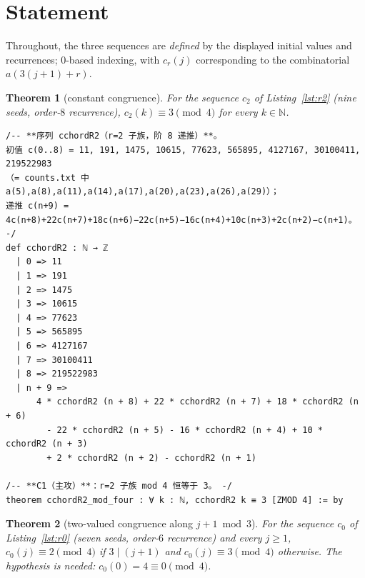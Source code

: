 \documentclass[11pt]{article}
\newtheorem{theorem}{Theorem}
\theoremstyle{definition}
\begin{document}
\section{Statement}\label{sec:statement}

Throughout, the three sequences are \emph{defined} by the displayed initial
values and recurrences; $0$-based indexing, with $c_r(j)$ corresponding to the
combinatorial $a(3(j+1)+r)$.

\begin{theorem}[constant congruence]\label{thm:r2}
For the sequence $c_2$ of Listing~\ref{lst:r2} (nine seeds, order-$8$
recurrence), $c_2(k)\equiv 3\pmod 4$ for every $k\in\mathbb{N}$.
\end{theorem}

\begin{lstlisting}[caption={Frozen formal statement, verbatim lines 22--42 of
\texttt{formalized/01-cchord-mods.lean} (sha256 \texttt{a69d00e5}).},
label={lst:r2}]
/-- **序列 cchordR2（r=2 子族，阶 8 递推）**。
初值 c(0..8) = 11, 191, 1475, 10615, 77623, 565895, 4127167, 30100411, 219522983
（= counts.txt 中 a(5),a(8),a(11),a(14),a(17),a(20),a(23),a(26),a(29)）；
递推 c(n+9) = 4c(n+8)+22c(n+7)+18c(n+6)−22c(n+5)−16c(n+4)+10c(n+3)+2c(n+2)−c(n+1)。 -/
def cchordR2 : ℕ → ℤ
  | 0 => 11
  | 1 => 191
  | 2 => 1475
  | 3 => 10615
  | 4 => 77623
  | 5 => 565895
  | 6 => 4127167
  | 7 => 30100411
  | 8 => 219522983
  | n + 9 =>
      4 * cchordR2 (n + 8) + 22 * cchordR2 (n + 7) + 18 * cchordR2 (n + 6)
        - 22 * cchordR2 (n + 5) - 16 * cchordR2 (n + 4) + 10 * cchordR2 (n + 3)
        + 2 * cchordR2 (n + 2) - cchordR2 (n + 1)

/-- **C1（主攻）**：r=2 子族 mod 4 恒等于 3。 -/
theorem cchordR2_mod_four : ∀ k : ℕ, cchordR2 k ≡ 3 [ZMOD 4] := by
\end{lstlisting}

\begin{theorem}[two-valued congruence along $j+1\bmod 3$]\label{thm:r0}
For the sequence $c_0$ of Listing~\ref{lst:r0} (seven seeds, order-$6$
recurrence) and every $j\ge 1$,
$c_0(j)\equiv 2\pmod 4$ if $3\mid(j+1)$ and $c_0(j)\equiv 3\pmod 4$ otherwise.
The hypothesis is needed: $c_0(0)=4\equiv 0\pmod 4$.
\end{theorem}
\end{document}
